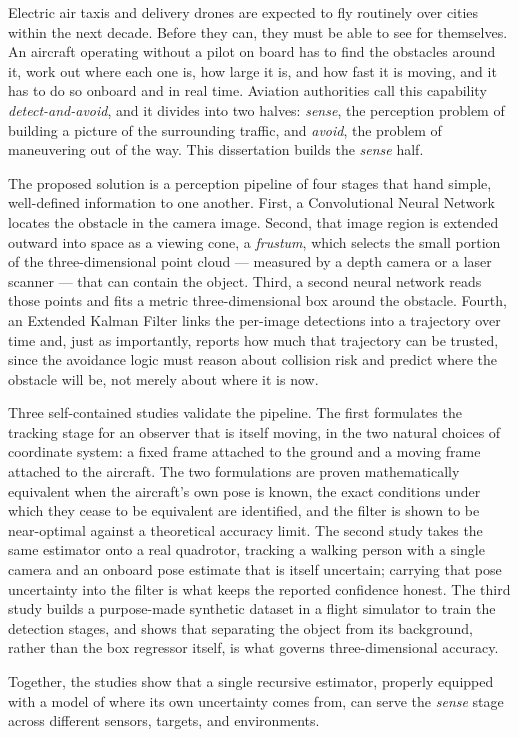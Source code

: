 
Electric air taxis and delivery drones are expected to fly routinely over cities
within the next decade. Before they can, they must be able to see for
themselves. An aircraft operating without a pilot on board has to find the
obstacles around it, work out where each one is, how large it is, and how fast it
is moving, and it has to do so onboard and in real time. Aviation authorities
call this capability \emph{detect-and-avoid}, and it divides into two halves:
\emph{sense}, the perception problem of building a picture of the surrounding
traffic, and \emph{avoid}, the problem of maneuvering out of the way. This
dissertation builds the \emph{sense} half.

The proposed solution is a perception pipeline of four stages that hand simple,
well-defined information to one another. First, a Convolutional Neural Network
locates the obstacle in the camera image. Second, that image region is extended
outward into space as a viewing cone, a \emph{frustum}, which selects the small
portion of the three-dimensional point cloud --- measured by a depth camera or a
laser scanner --- that can contain the object. Third, a second neural network
reads those points and fits a metric three-dimensional box around the obstacle.
Fourth, an Extended Kalman Filter links the per-image detections into a
trajectory over time and, just as importantly, reports how much that trajectory
can be trusted, since the avoidance logic must reason about collision risk and
predict where the obstacle will be, not merely about where it is now.

Three self-contained studies validate the pipeline. The first formulates the
tracking stage for an observer that is itself moving, in the two natural choices
of coordinate system: a fixed frame attached to the ground and a moving frame
attached to the aircraft. The two formulations are proven mathematically
equivalent when the aircraft's own pose is known, the exact conditions under
which they cease to be equivalent are identified, and the filter is shown to be
near-optimal against a theoretical accuracy limit. The second study takes the
same estimator onto a real quadrotor, tracking a walking person with a single
camera and an onboard pose estimate that is itself uncertain; carrying that pose
uncertainty into the filter is what keeps the reported confidence honest. The
third study builds a purpose-made synthetic dataset in a flight simulator to
train the detection stages, and shows that separating the object from its
background, rather than the box regressor itself, is what governs
three-dimensional accuracy.

Together, the studies show that a single recursive estimator, properly equipped
with a model of where its own uncertainty comes from, can serve the \emph{sense}
stage across different sensors, targets, and environments.
